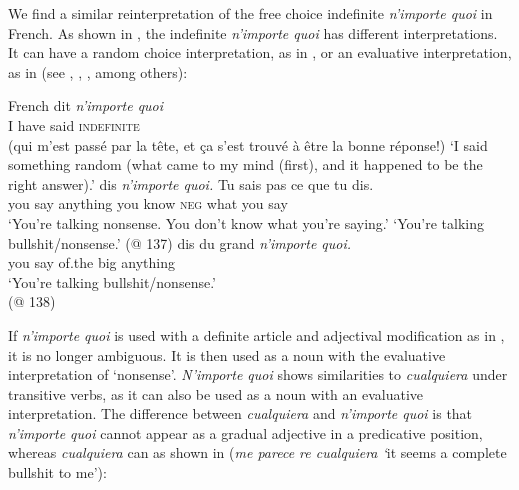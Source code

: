 We find a similar reinterpretation of the free choice indefinite \textit{n’importe quoi} in French. As shown in , the indefinite \textit{n’importe quoi} has different interpretations. It can have a random choice interpretation, as in , or an evaluative interpretation, as in  (see \citealt{Larrivee2007}, \citealt{Paillard1997}, \citealt{Pescarini2009}, among others):

\ea \label{bkm:Ref62641804} %
French
\ea \label{bkm:Ref62641804-1}  {dit} \textit{n’importe quoi}\\
{I have} said \textsc{indefinite}\\

{(qui m’est passé par la tête, et ça s’est trouvé à être la bonne réponse!)}
\glt ‘I said something random (what came to my mind (first), and it happened to be the right answer).’ \citep[4]{Larrivee2007}
\ex \label{bkm:Ref62641804-2} 
 {dis} \textit{n’importe quoi.} {Tu} {sais} {pas} {ce que} {tu} {dis.}\\
you say anything you know \textsc{neg} what you say\\
\glt ‘You’re talking nonsense. You don’t know what you’re saying.’
\glt ‘You’re talking bullshit/nonsense.’
    (@ 137)
\ex \label{bkm:Ref62641804-3} 
 {dis} {du} {grand} \textit{n’importe quoi.}\\
you say of.the big anything\\
\glt ‘You’re talking bullshit/nonsense.’\\
    (@ 138)
\z
\z

If \textit{n’importe quoi} is used with a definite article and adjectival modification as in , it is no longer ambiguous. It is then used as a noun with the evaluative interpretation of ‘nonsense’. \textit{N’importe quoi} shows similarities to \textit{cualquiera} under transitive verbs, as it can also be used as a noun with an evaluative interpretation. The difference between \textit{cualquiera} and \textit{n’importe quoi} is that \textit{n’importe quoi} cannot appear as a gradual adjective in a predicative position, whereas \textit{cualquiera} can as shown in  (\textit{me parece re cualquiera ‘}it seems a complete bullshit to me’):

\z 

